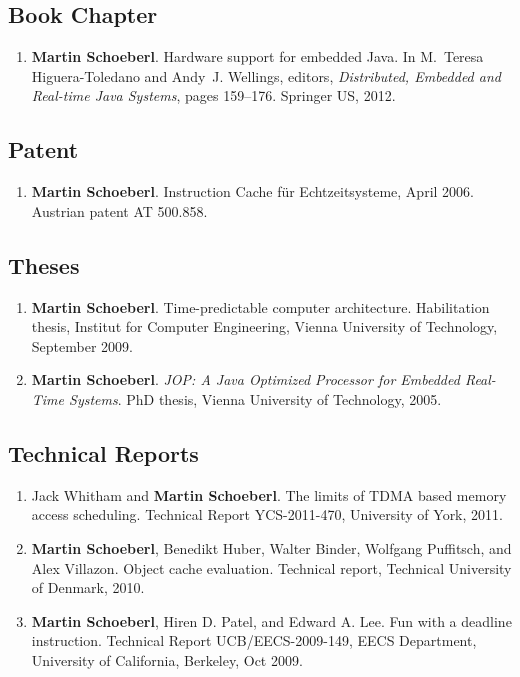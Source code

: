 \documentclass[%
    a4paper,
    11pt, %
    headinclude, footexclude,
    notitlepage,
    headsepline,
    pointlessnumbers,
    ]{scrartcl}
\begin{document}
\subsection*{Book Chapter}

\begin{enumerate}

\item {\bf Martin Schoeberl}.
 Hardware support for embedded {Java}.
 In M.~Teresa Higuera-Toledano and Andy~J. Wellings, editors, {\em
  Distributed, Embedded and Real-time {Java} Systems}, pages 159--176. Springer
  US, 2012.
\end{enumerate}

\subsection*{Patent}

\begin{enumerate}

\item {\bf Martin Schoeberl}. Instruction Cache f\"ur Echtzeitsysteme,
    April 2006. Austrian patent AT 500.858.
\end{enumerate}


\subsection*{Theses}

\begin{enumerate}

\item {\bf Martin Schoeberl}.
 Time-predictable computer architecture.
 Habilitation thesis, Institut for Computer Engineering, Vienna
  University of Technology, September 2009.

\item {\bf Martin Schoeberl}. {\em JOP: A Java Optimized Processor for
    Embedded Real-Time Systems}. PhD thesis, Vienna University of
    Technology, 2005.
\end{enumerate}



  
\subsection*{Technical Reports}

\begin{enumerate}

\item Jack Whitham and {\bf Martin Schoeberl}.
 The limits of TDMA based memory access scheduling.
 Technical Report YCS-2011-470, University of York, 2011.

\item {\bf Martin Schoeberl}, Benedikt Huber, Walter Binder, Wolfgang Puffitsch, and Alex
  Villazon.
 Object cache evaluation.
 Technical report, Technical University of Denmark, 2010.

\item {\bf Martin Schoeberl}, Hiren D. Patel, and Edward A. Lee. Fun
    with a deadline instruction. Technical Report
UCB/EECS-2009-149, EECS Department, University of
  California, Berkeley, Oct 2009.
 

\end{enumerate}
\end{document}
